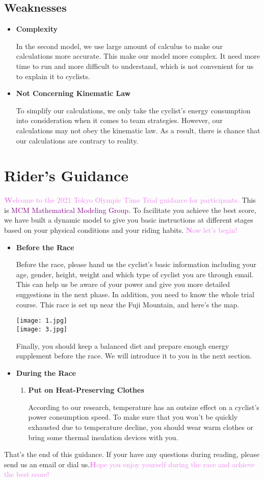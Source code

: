 \documentclass[14pt]{article}
\newcommand{\itembf}{\item \textbf}
\newcommand{\violetbf}[1]{\textcolor{violet}{\textbf #1}}
\theoremstyle{definition}
\theoremstyle{remark}
\numberwithin{equation}{section}
\begin{document}
	\subsection*{Weaknesses}
	\begin{itemize}
		\itembf{Complexity}
		
			In the second model, we use large amount of calculus to make our calculations more accurate. This make our model more complex. It need more time to run and more difficult to understand, which is not convenient for us to explain it to cyclists.
		\itembf{Not Concerning Kinematic Law}
		
			To simplify our calculations, we only take the cyclist's energy consumption into consideration when it comes to team strategies. However, our calculations may not obey the kinematic law. As a result, there is chance that our calculations are contrary to reality.

	\end{itemize}
	\newpage
	\section{Rider's Guidance}
	\violetbf{Welcome to the 2021 Tokyo Olympic Time Trial guidance for participants.} This is \textcolor{purple}{MCM Mathematical Modeling Group}. To facilitate you achieve the best score, we have built a dynamic model to give you basic instructions at different stages based on your physical conditions and your riding habits. \violetbf{Now let's begin!}
	\begin{itemize}
	\itembf {Before the Race}
		
			Before the race, please hand us the cyclist's basic information including your age, gender, height, weight and which type of cyclist you are through email. This can help us be aware of your power and give you more detailed suggestions in the next phase. In addition, you need to know the whole trial course. This race is set up near the Fuji Mountain, and here's the map.\cite{tokyo}

			\begin{center}
				\texttt{[image: 1.jpg]}\\
				\texttt{[image: 3.jpg]}
			\end{center}

			Finally, you should keep a balanced diet and prepare enough energy supplement before the race. We will introduce it to you in the next section.
	\itembf{During the Race}
	\begin{enumerate}	
		\itembf{Put on Heat-Preserving Clothes}
		
			According to our research, temperature has an outsize effect on a cyclist's power consumption speed. To make sure that you won't be quickly exhausted due to temperature decline, you should wear warm clothes or bring some thermal insulation devices with you. 
	\end{enumerate}
	\end{itemize}
	That's the end of this guidance. If your have any questions during reading, please send us an email or dial us.\violetbf{Hope you enjoy yourself during the race and achieve the best score!}
\end{document}

